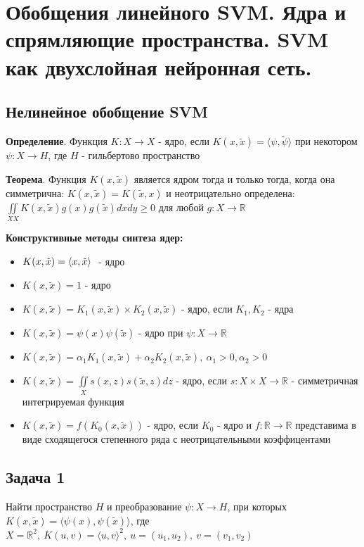 \section{Обобщения линейного SVM. Ядра и спрямляющие пространства. SVM как двухслойная нейронная сеть.}
\subsection*{Нелинейное обобщение SVM}
\textbf{Определение}. Функция $K: X \rightarrow X$ - ядро, если $K(x, \tilde{x}) = \langle \psi, \tilde{\psi} \rangle $ при некотором $\psi: X \rightarrow H$, где $H$ - гильбертово пространство

\noindent\textbf{Теорема}. Функция $K(x, \tilde{x})$ является ядром тогда и только тогда, когда
она симметрична: $K(x, \tilde{x}) = K(\tilde{x}, x)$ и неотрицательно определена:
$ \iint\limits_{XX} K(x, \tilde{x})g(x)g(\tilde{x}) dxdy \ge 0$ для любой $g: X \rightarrow \mathbb{R}$

\noindent\textbf{Конструктивные методы синтеза ядер:}
\begin{itemize}
    \item $K(x, \tilde{x}) = \text{\textlangle} x, \tilde{x} \text{\textrangle} ~$ - ядро
    \item $K(x, \tilde{x}) = 1$ - ядро
    \item $K(x, \tilde{x}) = K_1(x, \tilde{x}) \times K_2(x, \tilde{x})$ - ядро, если $K_1, K_2$ - ядра
    \item $K(x, \tilde{x}) = \psi(x)\psi(\tilde{x})$ - ядро при $\psi: X \rightarrow \mathbb{R}$
    \item $K(x, \tilde{x}) = \alpha_1 K_1(x, \tilde{x}) + \alpha_2 K_2(x, \tilde{x}), ~ \alpha_1 > 0, \alpha_2 > 0$
    \item $K(x ,\tilde{x}) = \iint\limits_{X} s(x, z) s(\tilde{x}, z) dz$ - ядро, если $s: X \times X \rightarrow \mathbb{R}$ - симметричная интегрируемая функция
    \item $K(x, \tilde{x}) = f(K_0(x, \tilde{x}))$ - ядро, если $K_0$ - ядро и $f: \mathbb{R} \rightarrow \mathbb{R}$ представима в виде сходящегося степенного ряда с неотрицательными коэффицентами
\end{itemize}

\subsection{Задача 1}
Найти пространство $H$ и преобразование $\psi: X \rightarrow H$, при которых
$K(x, \tilde{x}) = \langle \psi(x),\psi(\tilde{x}) \rangle $, где $X = \mathbb{R}^2,~
    K(u, v) = \langle u, v \rangle^2,~ u = (u_1, u_2),~ v = (v_1, v_2)$
